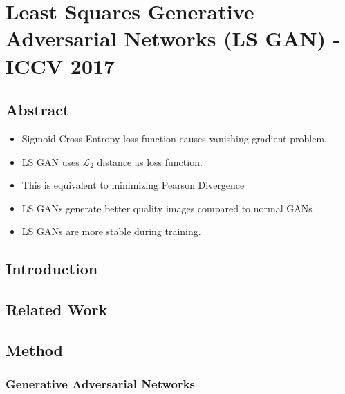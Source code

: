 \documentclass{article}
\begin{document}
    \section{Least Squares Generative Adversarial Networks (LS GAN) - ICCV 2017}\label{sec:Least_Squares_Generative_Adversarial_Networks_(LS_GAN)_ICCV_2017}
    \subsection*{Abstract}
    \begin{itemize}
        \item Sigmoid Cross-Entropy loss function causes vanishing gradient problem.
        \item LS GAN uses $\mathcal{L}_2$ distance as loss function.
        \item This is equivalent to minimizing Pearson Divergence
        \item LS GANs generate better quality images compared to normal GANs
        \item LS GANs are more stable during training.
    \end{itemize}

    \subsection{Introduction}\label{subsec:Least_Squares_Generative_Adversarial_Networks_(LS_GAN)_ICCV_2017:introduction}

    \subsection{Related Work}\label{subsec:Least_Squares_Generative_Adversarial_Networks_(LS_GAN)_ICCV_2017:related-work}

    \subsection{Method}\label{subsec:Least_Squares_Generative_Adversarial_Networks_(LS_GAN)_ICCV_2017:method}

    \subsubsection{Generative Adversarial Networks}\label{subsubsec:Least_Squares_Generative_Adversarial_Networks_(LS_GAN)_ICCV_2017:gans}
\end{document}
